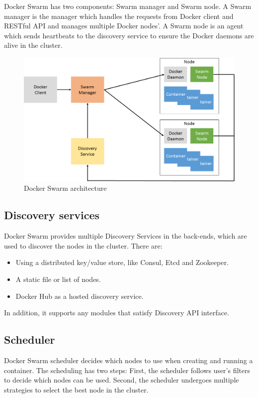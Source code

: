 Docker Swarm has two components: Swarm manager and Swarm node. A Swarm manager is the manager which handles the requests from Docker client and RESTful API and manages multiple Docker nodes'. A Swarm node is an agent which sends heartbeats to the discovery service to ensure the Docker daemons are alive in the cluster.

\begin{figure}[h]
\begin{center}
\includegraphics[width=15cm]{figure/swarm_docker.png}
\end{center}
\caption{Docker Swarm architecture}
\end{figure}

\subsection{Discovery services}
Docker Swarm provides multiple Discovery Services in the back-ends, which are used to discover the nodes in the cluster. There are:
\begin{itemize}
    \item Using a distributed key/value store, like Consul, Etcd and Zookeeper.
    \item A static file or list of nodes.
    \item Docker Hub as a hosted discovery service.
\end{itemize}
In addition, it supports any modules that satisfy Discovery API interface.

\subsection{Scheduler}
Docker Swarm scheduler decides which nodes to use when creating and running a container. The scheduling has two steps:
First, the scheduler follows user's filters to decide which nodes can be used.
Second, the scheduler undergoes multiple strategies to select the best node in the cluster.

